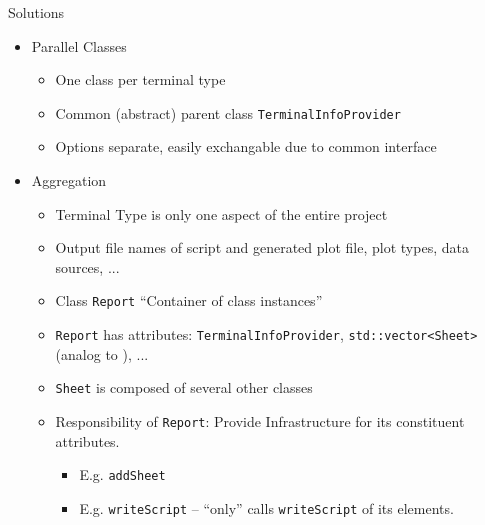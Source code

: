 \begin{frame}{Solutions}
%
\begin{itemize}
\item Parallel Classes
	\begin{itemize}
	\item One class per terminal type
	\item Common (abstract) parent class \texttt{TerminalInfoProvider}
	\item[\Thus] Options separate, easily exchangable due to common interface
	\end{itemize}
	\pause
\item Aggregation
	\begin{itemize}
	\item Terminal Type is only one aspect of the entire project
	\item Output file names of script and generated plot file, plot types, data sources, ...
	\item[\Thus] Class \texttt{Report} \enquote{Container of class instances}
	\item[\Thus] \texttt{Report} has attributes: \texttt{TerminalInfoProvider}, \texttt{std::vector<Sheet>} (analog to ), ...
	\item[\Thus] \texttt{Sheet} is composed of several other classes
		\pause
	\item[\Thus] Responsibility of \texttt{Report}: Provide Infrastructure for its constituent attributes.
		\begin{itemize}
		\item E.\;g. \texttt{addSheet}
		\item E.\;g. \texttt{writeScript} -- \enquote{only} calls \texttt{writeScript} of its elements.
		\end{itemize}
	\end{itemize}
\end{itemize}
%
\end{frame}


